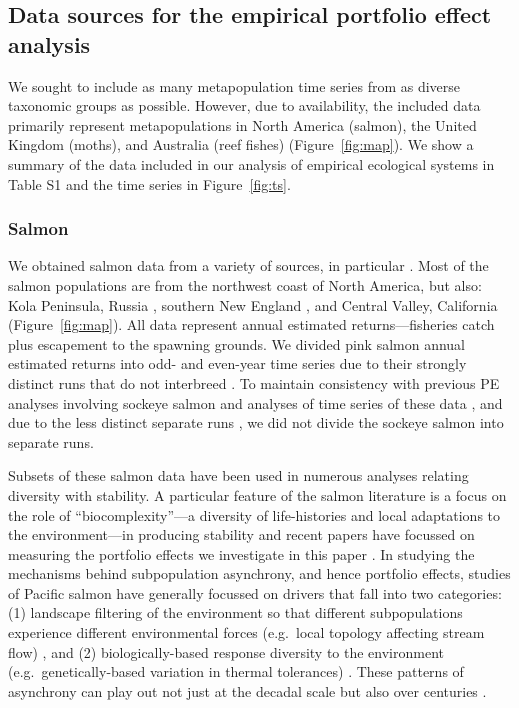 \subsection{Data sources for the empirical portfolio effect analysis}
We sought to include as many metapopulation time series from as diverse
taxonomic groups as possible. However, due to availability, the included data
primarily represent metapopulations in North America (salmon), the United
Kingdom (moths), and Australia (reef fishes) (Figure~\ref{fig:map}). We show a
summary of the data included in our analysis of empirical ecological systems
in Table S1 and the time series in Figure~\ref{fig:ts}.

\subsubsection{Salmon}
We obtained salmon data from a variety of sources, in particular
\citet{dorner2008}. Most of the salmon populations are from the northwest
coast of North America, but also: Kola Peninsula, Russia
\citep{jensen1999}, southern New England \citep{kocik2006}, and
Central Valley, California \citep{carlson2011} (Figure~\ref{fig:map}). All
data represent annual estimated returns---fisheries catch plus escapement to
the spawning grounds. We divided pink salmon annual estimated returns into odd-
and even-year time series due to their strongly distinct runs that do not
interbreed \citep{quinn2005}. To maintain consistency with previous PE
analyses involving sockeye salmon \citep{schindler2010} and analyses of
time series of these data \citep{dorner2008}, and due to the less distinct
separate runs \citep{quinn2005}, we did not divide the sockeye salmon into
separate runs.

Subsets of these salmon data have been used in numerous analyses relating
diversity with stability. A particular feature of the salmon literature is a
focus on the role of ``biocomplexity''---a diversity of life-histories and
local adaptations to the environment---in producing stability
\citep{hilborn2003} and recent papers have focussed on measuring the
portfolio effects we investigate in this paper \citep{schindler2010,
  carlson2011}. In studying the mechanisms behind subpopulation
asynchrony, and hence portfolio effects, studies of Pacific salmon have
generally focussed on drivers that fall into two categories: (1) landscape
filtering of the environment so that different subpopulations experience
different environmental forces (e.g.\ local topology affecting stream flow)
\citep[e.g.][]{schindler2008}, and (2) biologically-based response
diversity to the environment (e.g.\ genetically-based variation in thermal
tolerances) \citep[e.g.][]{eliason2011}. These patterns of asynchrony can
play out not just at the decadal scale but also over centuries
\citep{rogers2013}.

